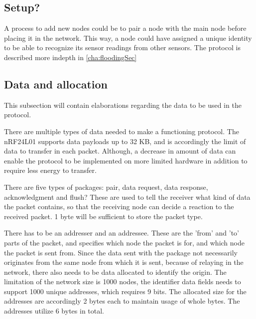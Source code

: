 \subsection{Setup?}
A process to add new nodes could be to pair a node with the main node before placing it in the network. This way, a node could have assigned a unique identity to be able to recognize its sensor readings from other sensors. 
The protocol is described more indepth in \ref{cha:floodingSec}




\subsection{Data and allocation}
This subsection will contain elaborations regarding the data to be used in the protocol.

There are multiple types of data needed to make a functioning protocol. The nRF24L01 supports data payloads up to 32 KB, and is accordingly the limit of data to transfer in each packet. Although, a decrease in amount of data can enable the protocol to be implemented on more limited hardware in addition to require less energy to transfer.

There are five types of packages: pair, data request, data response, acknowledgment and flush? These are used to tell the receiver what kind of data the packet contains, so that the receiving node can decide a reaction to the received packet. 1 byte will be sufficient to store the packet type.

There has to be an addresser and an addressee. These are the 'from' and 'to' parts of the packet, and specifies which node the packet is for, and which node the packet is sent from. Since the data sent with the package not necessarily originates from the same node from which it is sent, because of relaying in the network, there also needs to be data allocated to identify the origin. The limitation of the network size is 1000 nodes, the identifier data fields needs to support 1000 unique addresses, which requires 9 bits. The allocated size for the addresses are accordingly 2 bytes each to maintain usage of whole bytes. The addresses utilize 6 bytes in total.

